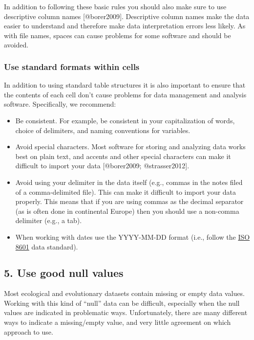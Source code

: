 In addition to following these basic rules you should also make sure to
use descriptive column names {[}@borer2009{]}. Descriptive column names
make the data easier to understand and therefore make data
interpretation errors less likely. As with file names, spaces can cause
problems for some software and should be avoided.

\subsubsection{Use standard formats within
cells}\label{use-standard-formats-within-cells}

In addition to using standard table structures it is also important to
ensure that the contents of each cell don't cause problems for data
management and analysis software. Specifically, we recommend:

\begin{itemize}
\itemsep1pt\parskip0pt
\item
  Be consistent. For example, be consistent in your capitalization of
  words, choice of delimiters, and naming conventions for variables.
\item
  Avoid special characters. Most software for storing and analyzing data
  works best on plain text, and accents and other special characters can
  make it difficult to import your data {[}@borer2009; @strasser2012{]}.
\item
  Avoid using your delimiter in the data itself (e.g., commas in the
  notes filed of a comma-delimited file). This can make it difficult to
  import your data properly. This means that if you are using commas as
  the decimal separator (as is often done in continental Europe) then
  you should use a non-comma delimiter (e.g., a tab).
\item
  When working with dates use the YYYY-MM-DD format (i.e., follow the
  \href{http://www.iso.org/iso/support/faqs/faqs_widely_used_standards/widely_used_standards_other/iso8601}{ISO
  8601} data standard).
\end{itemize}

\subsection{5. Use good null values}\label{use-good-null-values}

Most ecological and evolutionary datasets contain missing or empty data
values. Working with this kind of ``null'' data can be difficult,
especially when the null values are indicated in problematic ways.
Unfortunately, there are many different ways to indicate a missing/empty
value, and very little agreement on which approach to use.

